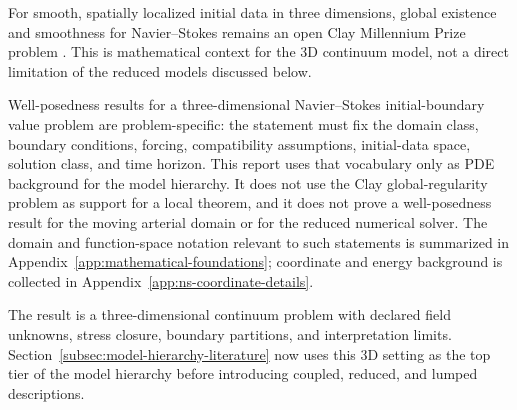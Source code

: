 \begin{remark}
    \label{rmk:global-regularity}
    For smooth, spatially localized initial data in three dimensions, global
    existence and smoothness for Navier--Stokes remains an open Clay Millennium
    Prize problem \cite[Problem statement]{ClayMathematicsInstitute2022NavierStokesEquation}. This is
    mathematical context for the 3D continuum model, not a direct limitation of
    the reduced models discussed below.
\end{remark}

Well-posedness results for a three-dimensional Navier--Stokes
initial-boundary value problem are problem-specific: the statement must fix the
domain class, boundary conditions, forcing, compatibility assumptions,
initial-data space, solution class, and time horizon. This report uses
that vocabulary only as PDE background for the model hierarchy. It does not use
the Clay global-regularity problem as support for a local theorem, and it does
not prove a well-posedness result for the moving arterial domain or for the
reduced numerical solver. The domain and function-space notation relevant to
such statements is summarized in Appendix~\ref{app:mathematical-foundations};
coordinate and energy background is collected in
Appendix~\ref{app:ns-coordinate-details}.

The result is a three-dimensional continuum problem with declared field
unknowns, stress closure, boundary partitions, and interpretation limits.
Section~\ref{subsec:model-hierarchy-literature} now uses this 3D
setting as the top tier of the model hierarchy before introducing coupled,
reduced, and lumped descriptions.
